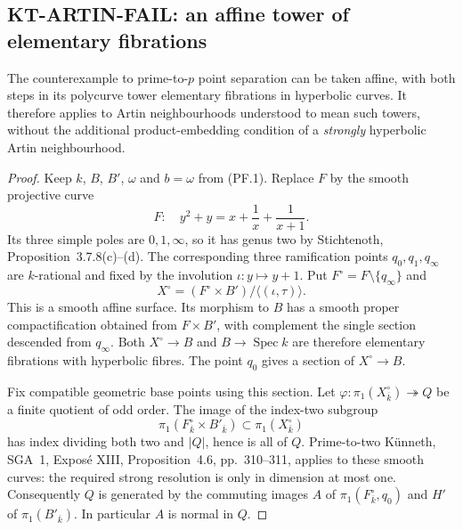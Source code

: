 \subsection{KT-ARTIN-FAIL: an affine tower of elementary fibrations}
\label{sec:kt-artin-fail}

\begin{proposition}
The counterexample to prime-to-$p$ point separation can be taken
affine, with both steps in its polycurve tower elementary
fibrations in hyperbolic curves. It therefore applies to Artin
neighbourhoods understood to mean such towers, without the
additional product-embedding condition of a \emph{strongly}
hyperbolic Artin neighbourhood.
\end{proposition}

\begin{proof}
Keep $k$, $B$, $B'$, $\omega$ and $b=\omega$ from (PF.1).
Replace $F$ by the smooth projective curve
\[
 F:\quad y^2+y=x+\frac1x+\frac1{x+1}.
                                                               \tag{AF.1}
\]
Its three simple poles are $0,1,\infty$, so it has genus two
by Stichtenoth, Proposition~3.7.8(c)--(d). The corresponding
three ramification points $q_0,q_1,q_\infty$ are $k$-rational
and fixed by the involution $\iota:y\mapsto y+1$.
Put $F^\circ=F\setminus\{q_\infty\}$ and
\[
 X^\circ=(F^\circ\times B')/\langle(\iota,\tau)\rangle.
                                                               \tag{AF.2}
\]
This is a smooth affine surface. Its morphism to $B$ has a
smooth proper compactification obtained from $F\times B'$,
with complement the single section descended from $q_\infty$.
Both $X^\circ\to B$ and $B\to\operatorname{Spec}k$ are
therefore elementary fibrations with hyperbolic fibres.
The point $q_0$ gives a section of $X^\circ\to B$.

Fix compatible geometric base points using this section.
Let $\varphi:\pi_1(X^\circ_{\overline k})\twoheadrightarrow Q$
be a finite quotient of odd order. The image of the index-two
subgroup
\[
 \pi_1(F^\circ_{\overline k}\times B'_{\overline k})
 \subset\pi_1(X^\circ_{\overline k})
\]
has index dividing both two and $|Q|$, hence is all of $Q$.
Prime-to-two K\"unneth, SGA~1, Expos\'e XIII,
Proposition~4.6, pp.~310--311, applies to these smooth curves:
the required strong resolution is only in dimension at most
one. Consequently $Q$ is generated by the commuting images
$A$ of $\pi_1(F^\circ_{\overline k},q_0)$ and $H'$ of
$\pi_1(B'_{\overline k})$. In particular $A$ is normal in $Q$.


\end{proof}
